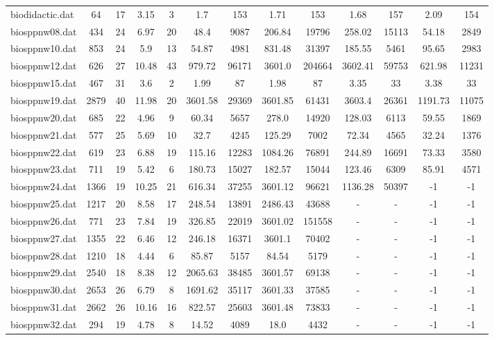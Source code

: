 \begin{table}[!ht]
{\begin{tabular}{lcccccccccccc}
biodidactic.dat & 64 & 17 & 3.15 & 3 & 1.7 & 153 & 1.71 & 153 & 1.68 & 157 & 2.09 & 154 \\
biosppnw08.dat & 434 & 24 & 6.97 & 20 & 48.4 & 9087 & 206.84 & 19796 & 258.02 & 15113 & 54.18 & 2849 \\
biosppnw10.dat & 853 & 24 & 5.9 & 13 & 54.87 & 4981 & 831.48 & 31397 & 185.55 & 5461 & 95.65 & 2983 \\
biosppnw12.dat & 626 & 27 & 10.48 & 43 & 979.72 & 96171 & 3601.0 & 204664 & 3602.41 & 59753 & 621.98 & 11231 \\
biosppnw15.dat & 467 & 31 & 3.6 & 2 & 1.99 & 87 & 1.98 & 87 & 3.35 & 33 & 3.38 & 33 \\
biosppnw19.dat & 2879 & 40 & 11.98 & 20 & 3601.58 & 29369 & 3601.85 & 61431 & 3603.4 & 26361 & 1191.73 & 11075 \\
biosppnw20.dat & 685 & 22 & 4.96 & 9 & 60.34 & 5657 & 278.0 & 14920 & 128.03 & 6113 & 59.55 & 1869 \\
biosppnw21.dat & 577 & 25 & 5.69 & 10 & 32.7 & 4245 & 125.29 & 7002 & 72.34 & 4565 & 32.24 & 1376 \\
biosppnw22.dat & 619 & 23 & 6.88 & 19 & 115.16 & 12283 & 1084.26 & 76891 & 244.89 & 16691 & 73.33 & 3580 \\
biosppnw23.dat & 711 & 19 & 5.42 & 6 & 180.73 & 15027 & 182.57 & 15044 & 123.46 & 6309 & 85.91 & 4571 \\
biosppnw24.dat & 1366 & 19 & 10.25 & 21 & 616.34 & 37255 & 3601.12 & 96621 & 1136.28 & 50397 & -1 & -1 \\
biosppnw25.dat & 1217 & 20 & 8.58 & 17 & 248.54 & 13891 & 2486.43 & 43688 &  - &  - & -1 & -1 \\
biosppnw26.dat & 771 & 23 & 7.84 & 19 & 326.85 & 22019 & 3601.02 & 151558 &  - &  - & -1 & -1 \\
biosppnw27.dat & 1355 & 22 & 6.46 & 12 & 246.18 & 16371 & 3601.1 & 70402 &  - &  - & -1 & -1 \\
biosppnw28.dat & 1210 & 18 & 4.44 & 6 & 85.87 & 5157 & 84.54 & 5179 &  - &  - & -1 & -1 \\
biosppnw29.dat & 2540 & 18 & 8.38 & 12 & 2065.63 & 38485 & 3601.57 & 69138 &  - &  - & -1 & -1 \\
biosppnw30.dat & 2653 & 26 & 6.79 & 8 & 1691.62 & 35117 & 3601.33 & 37585 &  - &  - & -1 & -1 \\
biosppnw31.dat & 2662 & 26 & 10.16 & 16 & 822.57 & 25603 & 3601.48 & 73833 &  - &  - & -1 & -1 \\
biosppnw32.dat & 294 & 19 & 4.78 & 8 & 14.52 & 4089 & 18.0 & 4432 &  - &  - & -1 & -1 \\

\end{tabular}}
\end{table}
